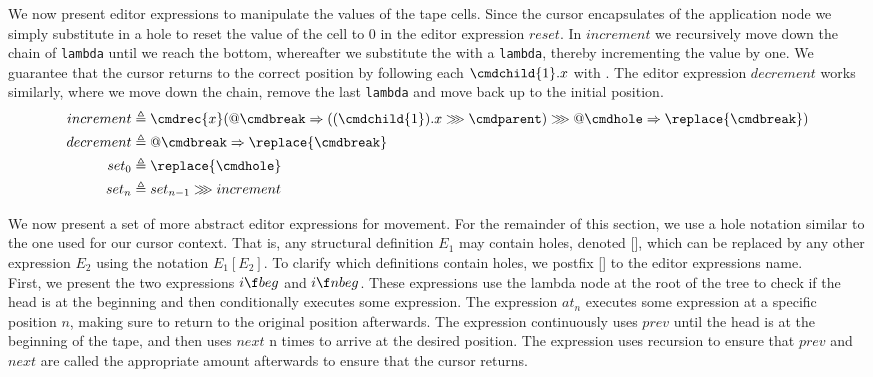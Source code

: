 We now present editor expressions to manipulate the values of the tape cells. Since the cursor encapsulates  of the application node we simply substitute in a hole to reset the value of the cell to 0 in the editor expression $reset$. In $increment$ we recursively move down the chain of \texttt{lambda} until we reach the bottom, whereafter we substitute the \cmdhole with a \texttt{lambda}, thereby incrementing the value by one. We guarantee that the cursor returns to the correct position by following each $\cmdchild{1}.x$ with \cmdparent. The editor expression $decrement$ works similarly, where we move down the chain, remove the last \texttt{lambda} and move back up to the initial position. 
\begin{align*}
    increment &\triangleq \cmdrec{x}(@\cmdbreak \Rightarrow ((\cmdchild{1}).x \ggg \cmdparent) \ggg @\cmdhole \Rightarrow \replace{\cmdbreak})\\
    decrement &\triangleq @\cmdbreak \Rightarrow \replace{\cmdbreak} \\
    set_0 &\triangleq \replace{\cmdhole}\\
    set_n &\triangleq set_{n-1} \ggg increment
\end{align*}

We now present a set of more abstract editor expressions for movement. For the remainder of this section, we use a hole notation similar to the one used for our cursor context. That is, any structural definition $E_1$ may contain holes, denoted [], which can be replaced by any other expression $E_2$ using the notation $E_1[E_2]$. To clarify which definitions contain holes, we postfix [] to the editor expressions name. \\


First, we present the two expressions $i\f beg$ and $i\f nbeg$. These expressions use the lambda node at the root of the tree to check if the head is at the beginning and then conditionally executes some expression. The expression $at_n$ executes some expression at a specific position $n$, making sure to return to the original position afterwards. The expression continuously uses $prev$ until the head is at the beginning of the tape, and then uses $next$ n times to arrive at the desired position. The expression uses recursion to ensure that $prev$ and $next$ are called the appropriate amount afterwards to ensure that the cursor returns.\\

